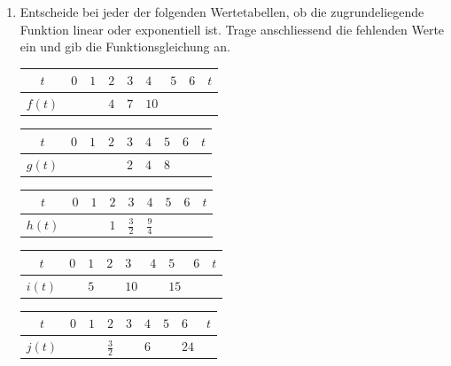 \documentclass[11pt,oneside]{article}
\begin{document}
	\begin{aufgabe}
		\begin{enumerate}
			\item Entscheide bei jeder der folgenden Wertetabellen, ob die zugrundeliegende Funktion linear oder exponentiell ist. Trage anschliessend die fehlenden Werte ein und gib die Funktionsgleichung an.
			\begingroup
			\renewcommand{\arraystretch}{1.5}
			\begin{table}[H]
				\centering
				\begin{tabular}{c|p{8mm}|p{8mm}|p{8mm}|p{8mm}|p{8mm}|p{8mm}|p{8mm}|p{8mm}}
					$t$ & $0$ & $1$ & $2$ & $3$ & $4$ & $5$ & $6$ & $t$ \\\hline
					$f(t)$ & & & $4$ & $7$ & $10$ & &
				\end{tabular}
			\end{table}
			\begin{table}[H]
				\centering
				\begin{tabular}{c|p{8mm}|p{8mm}|p{8mm}|p{8mm}|p{8mm}|p{8mm}|p{8mm}|p{8mm}}
					$t$ & $0$ & $1$ & $2$ & $3$ & $4$ & $5$ & $6$ & $t$ \\\hline
					$g(t)$ & & & & $2$ & $4$ & $8$ & &
				\end{tabular}
			\end{table}
			\begin{table}[H]
				\centering
				\begin{tabular}{c|p{8mm}|p{8mm}|p{8mm}|p{8mm}|p{8mm}|p{8mm}|p{8mm}|p{8mm}}
					$t$ & $0$ & $1$ & $2$ & $3$ & $4$ & $5$ & $6$ & $t$ \\\hline
					$h(t)$ & & & $1$ & $\frac{3}{2}$ & $\frac{9}{4}$ & & &
				\end{tabular}
			\end{table}
			\begin{table}[H]
				\centering
				\begin{tabular}{c|p{8mm}|p{8mm}|p{8mm}|p{8mm}|p{8mm}|p{8mm}|p{8mm}|p{8mm}}
					$t$ & $0$ & $1$ & $2$ & $3$ & $4$ & $5$ & $6$ & $t$ \\\hline
					$i(t)$ & & $5$ & & $10$ & & $15$ & &
				\end{tabular}
			\end{table}
			\begin{table}[H]
				\centering
				\begin{tabular}{c|p{8mm}|p{8mm}|p{8mm}|p{8mm}|p{8mm}|p{8mm}|p{8mm}|p{8mm}}
					$t$ & $0$ & $1$ & $2$ & $3$ & $4$ & $5$ & $6$ & $t$ \\\hline
					$j(t)$ & & & $\frac{3}{2}$ & & $6$ & & $24$ &
				\end{tabular}

\end{table}
\end{enumerate}
\end{aufgabe}
\end{document}
